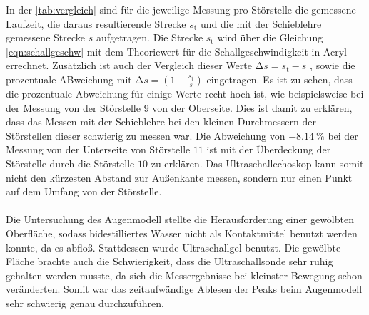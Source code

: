 \noindent In der \autoref{tab:vergleich} sind für die jeweilige Messung pro Störstelle die gemessene Laufzeit, die daraus resultierende Strecke $s_{\text{t}}$ und 
die mit der Schieblehre gemessene Strecke $s$ aufgetragen. Die Strecke $s_{\text{t}}$ wird über die Gleichung \eqref{eqn:schallgeschw} mit dem Theoriewert für 
die Schallgeschwindigkeit in Acryl errechnet. Zusätzlich ist auch der Vergleich dieser Werte $ \increment s = s_{\text{t}} - s $ , sowie die 
prozentuale ABweichung mit $ \increment s = (1-\frac{s_{\text{t}}}{s})$ eingetragen.
Es ist zu sehen, dass die prozentuale Abweichung für einige Werte recht hoch ist, wie beispielsweise bei der Messung von der Störstelle $9$ von der Oberseite.
Dies ist damit zu erklären, dass das Messen mit der Schieblehre bei den kleinen Durchmessern der Störstellen dieser schwierig zu messen war. 
Die Abweichung von $\SI{-8.14}{\percent}$ bei der Messung von der Unterseite von Störstelle $11$ ist mit der Überdeckung der Störstelle durch die Störstelle $10$ 
zu erklären. Das Ultraschallechoskop kann somit nicht den kürzesten Abstand zur Außenkante messen, sondern nur einen Punkt auf dem Umfang von der Störstelle. \\
\\


\noindent Die Untersuchung des Augenmodell stellte die Herausforderung einer gewölbten Oberfläche, sodass bidestilliertes Wasser nicht als Kontaktmittel benutzt 
werden konnte, da es abfloß. Stattdessen wurde Ultraschallgel benutzt. Die gewölbte Fläche brachte auch die Schwierigkeit, dass die Ultraschallsonde sehr ruhig 
gehalten werden musste, da sich die Messergebnisse bei kleinster Bewegung schon veränderten. Somit war das zeitaufwändige Ablesen der Peaks beim Augenmodell
sehr schwierig genau durchzuführen. 